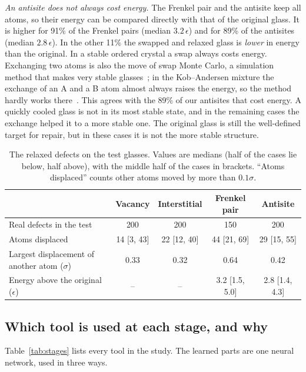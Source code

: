 \documentclass[10pt]{article}
\begin{document}
\emph{An antisite does not always cost energy.} The Frenkel pair and the antisite keep all atoms, so their energy can be compared directly with that of the original glass. It is higher for 91\% of the Frenkel pairs (median $3.2\,\epsilon$) and for 89\% of the antisites (median $2.8\,\epsilon$). In the other 11\% the swapped and relaxed glass is \emph{lower} in energy than the original. In a stable ordered crystal a swap always costs energy. Exchanging two atoms is also the move of swap Monte Carlo, a simulation method that makes very stable glasses~\citep{ninarello2017}; in the Kob--Andersen mixture the exchange of an A and a B atom almost always raises the energy, so the method hardly works there~\citep{parmar2020}. This agrees with the 89\% of our antisites that cost energy. A quickly cooled glass is not in its most stable state, and in the remaining cases the exchange helped it to a more stable one. The original glass is still the well-defined target for repair, but in these cases it is not the more stable structure.

\begin{table}[t]
\centering
\caption{The relaxed defects on the test glasses. Values are medians (half of the cases lie below, half above), with the middle half of the cases in brackets. ``Atoms displaced'' counts other atoms moved by more than $0.1\sigma$.}
\label{tab:physics}
\small
\begin{tabular}{@{}lcccc@{}}
\toprule
 & Vacancy & Interstitial & Frenkel pair & Antisite \\
\midrule
Real defects in the test & 200 & 200 & 150 & 200 \\
Atoms displaced & 14 [3, 43] & 22 [12, 40] & 44 [21, 69] & 29 [15, 55] \\
Largest displacement of another atom ($\sigma$) & 0.33 & 0.32 & 0.64 & 0.42 \\
Energy above the original ($\epsilon$) & -- & -- & 3.2 [1.5, 5.0] & 2.8 [1.4, 4.3] \\
\bottomrule
\end{tabular}
\end{table}

\subsection{Which tool is used at each stage, and why}

Table~\ref{tab:stages} lists every tool in the study. The learned parts are one neural network, used in three ways.
\end{document}
